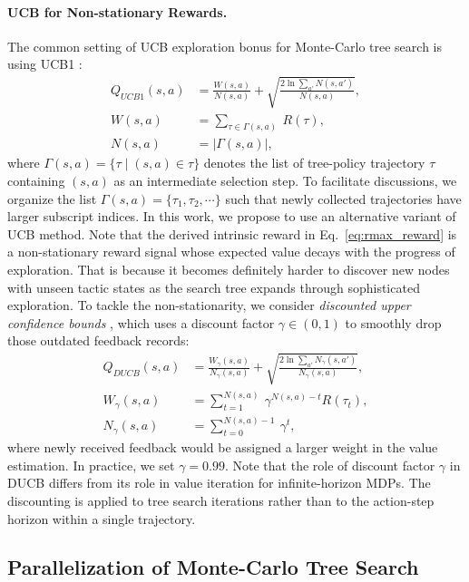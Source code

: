 \paragraph{UCB for Non-stationary Rewards.}
The common setting of UCB exploration bonus for Monte-Carlo tree search is using UCB1 \citep{auer2002finite}:
\begin{align} \label{eq:ucb1}
    Q_{UCB1}(s, a) &= \frac{W(s,a)}{N(s, a)} + \sqrt{\frac{2\ln\sum_{a'}N(s,a')}{N(s,a)}}, \\
    W(s,a) &= \textstyle{\sum_{\tau\in\Gamma(s,a)}}~R(\tau), \\
    N(s,a) &= \left|\Gamma(s,a)\right|,
\end{align}
where $\Gamma(s,a) = \{\tau\mid (s,a)\in\tau\}$ denotes the list of tree-policy trajectory $\tau$ containing $(s,a)$ as an intermediate selection step.
To facilitate discussions, we organize the list $\Gamma(s,a)=\{\tau_1,\tau_2,\cdots\}$ such that newly collected trajectories have larger subscript indices.
In this work, we propose to use an alternative variant of UCB method.
Note that the derived intrinsic reward in Eq.~\eqref{eq:rmax_reward} is a non-stationary reward signal whose expected value decays with the progress of exploration.
That is because it becomes definitely harder to discover new nodes with unseen tactic states as the search tree expands through sophisticated exploration.
To tackle the non-stationarity, we consider \textit{discounted upper confidence bounds} \citep[DUCB;][]{garivier2011upper}, which uses a discount factor $\gamma\in(0,1)$ to smoothly drop those outdated feedback records:
\begin{align} \label{eq:ducb}
    Q_{DUCB}(s, a) &= \frac{W_\gamma(s,a)}{N_\gamma(s, a)} + \sqrt{\frac{2\ln\sum_{a'}N_\gamma(s,a')}{N_\gamma(s,a)}}, \\
    W_\gamma(s,a) &= \textstyle{\sum_{t=1}^{N(s,a)}}~\gamma^{N(s,a)-t}R(\tau_t), \\
    N_\gamma(s,a) &= \textstyle{\sum_{t=0}^{N(s,a)-1}}~\gamma^t,
\end{align}
where newly received feedback would be assigned a larger weight in the value estimation.
In practice, we set $\gamma=0.99$.
Note that the role of discount factor $\gamma$ in DUCB differs from its role in value iteration for infinite-horizon MDPs.
The discounting is applied to tree search iterations rather than to the action-step horizon within a single trajectory.

\subsection{Parallelization of Monte-Carlo Tree Search}

